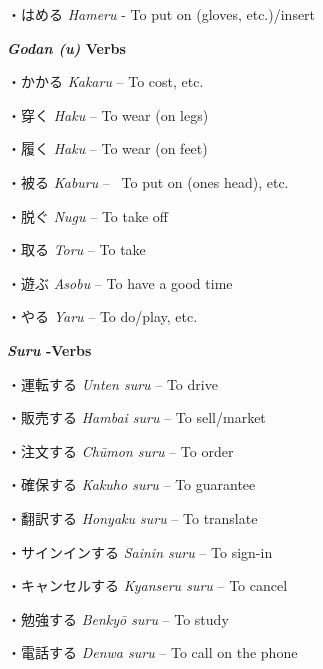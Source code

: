 \par{・はめる \emph{Hameru }- To put on (gloves, etc.)\slash insert  }

\par{\textbf{\emph{Godan (u) }Verbs }}

\par{・かかる \emph{Kakaru }– To cost, etc. }

\par{・穿く \emph{Haku }– To wear (on legs) }

\par{・履く \emph{Haku }– To wear (on feet) }

\par{・被る \emph{Kaburu }–  To put on (one\textquotesingle s head), etc. }

\par{・脱ぐ \emph{Nugu }– To take off }

\par{・取る \emph{Toru }– To take }

\par{・遊ぶ \emph{Asobu }– To have a good time }

\par{・やる \emph{Yaru }– To do\slash play, etc. }

\par{\textbf{\emph{Suru }-Verbs }}

\par{・運転する \emph{Unten suru }– To drive }

\par{・販売する \emph{Hambai suru }– To sell\slash market }

\par{・注文する \emph{Chūmon suru }– To order }

\par{・確保する \emph{Kakuho suru }– To guarantee }

\par{・翻訳する \emph{Hon\textquotesingle yaku suru }– To translate }

\par{・サインインする \emph{Sain\textquotesingle in suru }– To sign-in }

\par{・キャンセルする \emph{Kyanseru suru }– To cancel }

\par{・勉強する \emph{Benkyō suru }– To study }

\par{・電話する \emph{Denwa suru }– To call on the phone }

